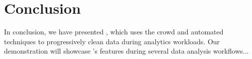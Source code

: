 \section{Conclusion}

In conclusion, we have presented \system, which uses the crowd and automated techniques to progressively clean data during analytics workloads. Our demonstration will showcase \system's features during several data analysis workflows...